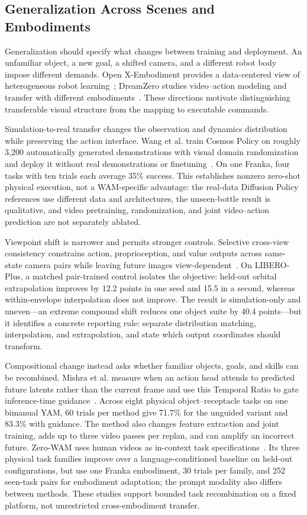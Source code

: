 \subsection{Generalization Across Scenes and Embodiments}
Generalization should specify what changes between training and deployment. An unfamiliar object, a new goal, a shifted camera, and a different robot body impose different demands. Open X-Embodiment provides a data-centered view of heterogeneous robot learning~\cite{oxe2024}; DreamZero studies video--action modeling and transfer with different embodiments~\cite{ye2026dreamzero}. These directions motivate distinguishing transferable visual structure from the mapping to executable commands.

Simulation-to-real transfer changes the observation and dynamics distribution while preserving the action interface. Wang et al. train Cosmos Policy on roughly 3,200 automatically generated demonstrations with visual domain randomization and deploy it without real demonstrations or finetuning~\cite{wang2026simtorealwam}. On one Franka, four tasks with ten trials each average 35\% success. This establishes nonzero zero-shot physical execution, not a WAM-specific advantage: the real-data Diffusion Policy references use different data and architectures, the unseen-bottle result is qualitative, and video pretraining, randomization, and joint video--action prediction are not separately ablated.

Viewpoint shift is narrower and permits stronger controls. Selective cross-view consistency constrains action, proprioception, and value outputs across same-state camera pairs while leaving future images view-dependent~\cite{huang2026scvc}. On LIBERO-Plus, a matched pair-trained control isolates the objective: held-out orbital extrapolation improves by 12.2 points in one seed and 15.5 in a second, whereas within-envelope interpolation does not improve. The result is simulation-only and uneven---an extreme compound shift reduces one object suite by 40.4 points---but it identifies a concrete reporting rule: separate distribution matching, interpolation, and extrapolation, and state which output coordinates should transform.

Compositional change instead asks whether familiar objects, goals, and skills can be recombined. Mishra et al. measure when an action head attends to predicted future latents rather than the current frame and use this Temporal Ratio to gate inference-time guidance~\cite{mishra2026temporalratio}. Across eight physical object--receptacle tasks on one bimanual YAM, 60 trials per method give 71.7\% for the unguided variant and 83.3\% with guidance. The method also changes feature extraction and joint training, adds up to three video passes per replan, and can amplify an incorrect future. Zero-WAM uses human videos as in-context task specifications~\cite{zhou2026zerowam}. Its three physical task families improve over a language-conditioned baseline on held-out configurations, but use one Franka embodiment, 30 trials per family, and 252 seen-task pairs for embodiment adaptation; the prompt modality also differs between methods. These studies support bounded task recombination on a fixed platform, not unrestricted cross-embodiment transfer.

